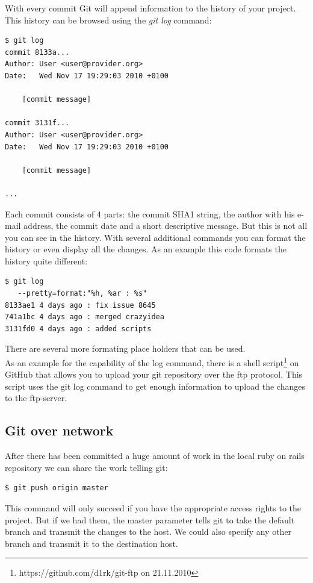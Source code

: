 With every commit Git will append information to the history of your project. This history
can be browsed using the \emph {git log} command:

\begin{lstlisting}
$ git log
commit 8133a...
Author: User <user@provider.org>
Date:   Wed Nov 17 19:29:03 2010 +0100

    [commit message]
    
commit 3131f...
Author: User <user@provider.org>
Date:   Wed Nov 17 19:29:03 2010 +0100

    [commit message]
    
...
\end{lstlisting}

Each commit consists of 4 parts: the commit SHA1 string, the author with his e-mail address, the commit date and a short descriptive message.
But this is not all you can see in the history. With several additional commands you can format the history or even display all the changes.
As an example this code formats the history quite different:

\begin{lstlisting}
$ git log 
   --pretty=format:"%h, %ar : %s"
8133ae1 4 days ago : fix issue 8645
741a1bc 4 days ago : merged crazyidea
3131fd0 4 days ago : added scripts
\end{lstlisting}

There are several more formating place holders that can be used. \cite[Chapter 2.4]{gitpro2009} \\

As an example for the capability of the log command, there is a shell script\footnote{https://github.com/d1rk/git-ftp on 21.11.2010} on GitHub that allows you to upload your git repository over the ftp protocol. This script uses the git log command to get enough information to upload the changes to the ftp-server. 

\subsection{Git over network}

After there has been committed a huge amount of work in the local ruby on rails
repository we can share the work telling git:

\begin{lstlisting}
$ git push origin master 
\end{lstlisting}

This command will only succeed if you have the appropriate access rights to the
project. But if we had them, the master parameter tells git to take the default
branch and transmit the changes to the host. We could also specify any other
branch and transmit it to the destination host. \\ 

